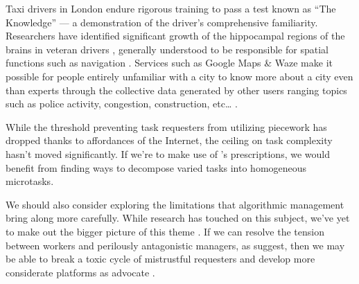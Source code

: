 \documentclass[trackingWork]{subfiles}
\begin{document}
Taxi drivers in London endure rigorous training to pass a test known as ``The Knowledge''
--- a demonstration of the driver's comprehensive familiarity.
Researchers have identified significant growth of
the hippocampal regions of the brains in veteran drivers%
, generally understood to be responsible for spatial functions such as navigation
\cite{Maguire11042000,Maguire2894,Skok:1999:KML:299513.299625%
,       skok2000managing,Woollett1407,woollett2011acquiring}.
Services such as Google Maps \& Waze make it possible for
people entirely unfamiliar with a city
to know more about a city even than experts through
the collective data generated by other users
ranging topics such as police activity, congestion, construction, etc\dots
\cite{silva2013traffic,hind2014outsmarting}. 

\subsubsubsection{\implication}
While the threshold preventing task requesters from utilizing piecework
has dropped thanks to affordances of the Internet, the ceiling on task complexity hasn't moved significantly. 
If we're to make use of \citeauthor{Brown01041990}'s prescriptions,
we would benefit from finding ways to decompose varied tasks into homogeneous microtasks. 

We should also consider exploring the limitations that algorithmic management bring along more carefully.
While research has touched on this subject, we've yet to make out the bigger picture of this theme
\cite{uberAlgorithm}.
If we can resolve the tension between workers and perilously antagonistic managers, as \citeauthor{10.2307/2118435} suggest,
then we may be able to break a toxic cycle of mistrustful requesters \cite[for example][]{MaliciouscrowdworkersGadiraju}
and develop more considerate platforms as \citeauthor{takingAHITMcInnis} advocate
\cite{takingAHITMcInnis}.
\end{document}

